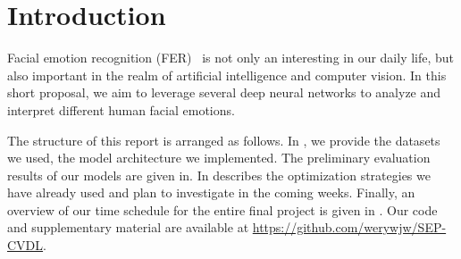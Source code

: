 \section{Introduction}
\label{sec:intro}

Facial emotion recognition (FER)~\cite{Ko18} is not only an interesting in our daily life, 
but also important in the realm of artificial intelligence and computer vision. 
In this short proposal, 
we aim to leverage several deep neural networks to analyze and interpret different human facial emotions.

The structure of this report is arranged as follows. 
In , 
we provide the datasets we used, 
the model architecture we implemented. 
The preliminary evaluation results of our models are given in. 
In  describes the optimization strategies we have already used and plan to investigate in the coming weeks. 
Finally,
an overview of our time schedule for the entire final project is given in . 
Our code and supplementary material are available at \url{https://github.com/werywjw/SEP-CVDL}.

